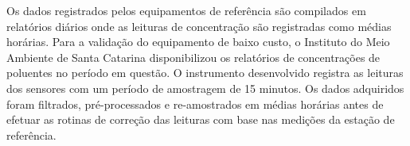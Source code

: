 Os dados registrados pelos equipamentos de referência são compilados em relatórios diários onde as leituras de concentração são registradas como médias horárias. Para a validação do equipamento de baixo custo, o Instituto do Meio Ambiente de Santa Catarina disponibilizou os relatórios de concentrações de poluentes no período em questão. O instrumento desenvolvido registra as leituras dos sensores com um período de amostragem de 15 minutos. Os dados adquiridos foram filtrados, pré-processados e re-amostrados em médias horárias antes de efetuar as rotinas de correção das leituras com base nas medições da estação de referência.